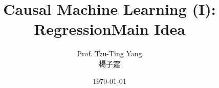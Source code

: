 \documentclass[dvipsnames,hyperref={pdfpagelabels=false}]{beamer}
\title[] 
{Causal Machine Learning (I): Regression}
\author 
{Prof. Tzu-Ting Yang  \\ 楊子霆}
\institute{Institute of Economics, Academia Sinica  \\ 中央研究院經濟研究所}
\date
{\today}
\begin{document}
\begin{frame}{}
 \titlepage
\end{frame}







\title[]
{Main Idea}


\author
{}

\institute{}






\date
{}


\begin{frame}{}
	\titlepage
\end{frame}
\end{document}
